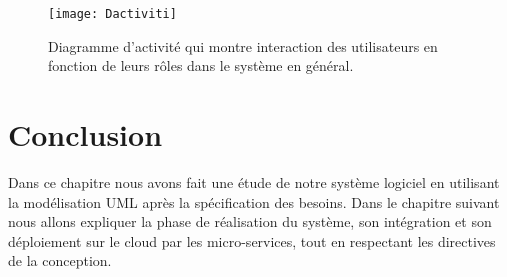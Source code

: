    \begin{figure}[H]
   	\centering
   	\texttt{[image: Dactiviti]}
   	\caption{Diagramme d'activité qui  montre interaction des  utilisateurs   en fonction de leurs rôles dans le système en général.}
   	\label{fig:dactiviti}
   \end{figure}
     
   \section{Conclusion}
   
   Dans ce chapitre nous avons fait une étude de notre système logiciel en utilisant la modélisation UML après la spécification des besoins.   
        Dans le chapitre suivant nous allons expliquer la phase de réalisation du système, son intégration et son déploiement sur le  cloud par les micro-services, tout en respectant les directives de la conception.
    
   